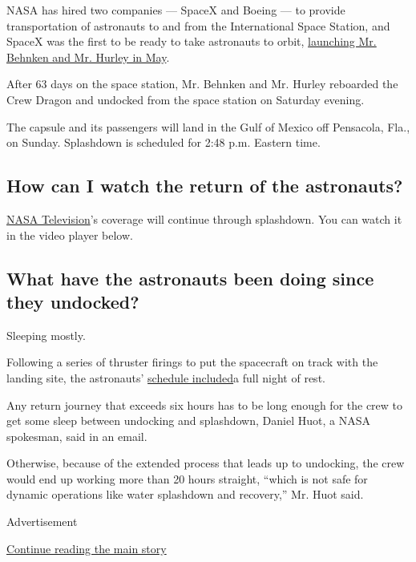NASA has hired two companies --- SpaceX and Boeing --- to provide
transportation of astronauts to and from the International Space
Station, and SpaceX was the first to be ready to take astronauts to
orbit,
\href{https://www.nytimes.com/2020/05/30/science/spacex-nasa-astronauts.html}{launching
Mr. Behnken and Mr. Hurley in May}.

After 63 days on the space station, Mr. Behnken and Mr. Hurley reboarded
the Crew Dragon and undocked from the space station on Saturday evening.

The capsule and its passengers will land in the Gulf of Mexico off
Pensacola, Fla., on Sunday. Splashdown is scheduled for 2:48 p.m.
Eastern time.

\hypertarget{how-can-i-watch-the-return-of-the-astronauts}{%
\subsection{How can I watch the return of the
astronauts?}\label{how-can-i-watch-the-return-of-the-astronauts}}

\href{https://www.nasa.gov/multimedia/nasatv/\#public}{NASA
Television}'s coverage will continue through splashdown. You can watch
it in the video player below.

\hypertarget{what-have-the-astronauts-been-doing-since-they-undocked}{%
\subsection{What have the astronauts been doing since they
undocked?}\label{what-have-the-astronauts-been-doing-since-they-undocked}}

Sleeping mostly.

Following a series of thruster firings to put the spacecraft on track
with the landing site, the astronauts'
\href{https://twitter.com/NASA/status/1289245570565992449}{schedule
included}a full night of rest.

Any return journey that exceeds six hours has to be long enough for the
crew to get some sleep between undocking and splashdown, Daniel Huot, a
NASA spokesman, said in an email.

Otherwise, because of the extended process that leads up to undocking,
the crew would end up working more than 20 hours straight, ``which is
not safe for dynamic operations like water splashdown and recovery,''
Mr. Huot said.

Advertisement

\protect\hyperlink{after-bottom}{Continue reading the main story}

